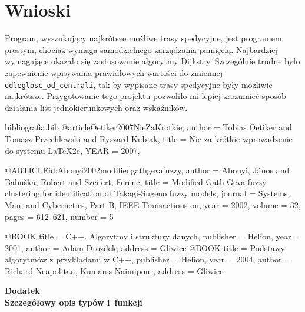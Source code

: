 \documentclass[12pt,a4paper,twoside]{article}
\begin{document}
\section{Wnioski}

Program, wyszukujący najkrótsze możliwe trasy spedycyjne, jest programem prostym, chociaż wymaga samodzielnego zarządzania pamięcią. Najbardziej wymagające okazało się zastosowanie algorytmy Dijkstry. Szczególnie trudne było zapewnienie wpisywania prawidłowych wartości do zmiennej \lstinline!odleglosc_od_centrali!, tak by wypisane trasy spedycyjne były możliwie najkrótsze. Przygotowanie tego projektu pozwoliło mi lepiej zrozumieć sposób działania list jednokierunkowych oraz wskaźników.



 

\begin{filecontents}{bibliografia.bib}
@article{Oetiker2007NieZaKrotkie,
	author       = {Tobias Oetiker and Tomasz Przechlewski and Ryszard Kubiak},
	title       = {Nie za kr\'{o}tkie wprowadzenie do systemu {L}a{T}e{X}2e}},
	YEAR         = {2007},


@ARTICLE{id:Abonyi2002modifiedgathgevafuzzy,
  author = {Abonyi, J\'{a}nos and Babu\v{s}ka, Robert and Szeifert, Ferenc},
  title = {{Modified Gath-Geva fuzzy clustering for identification of Takagi-Sugeno
	fuzzy models}},
  journal = {Systems, Man, and Cybernetics, Part B, IEEE Transactions on},
  year = {2002},
  volume = {32},
  pages = {612--621},
  number = {5}
}

@BOOK{
  title = {C++. Algorytmy i struktury danych},
  publisher = {Helion},
  year = {2001},
  author = {Adam Drozdek},
  address = {Gliwice}
}
@BOOK{
	title = {Podstawy algorytm\'{o}w z przykładami w C++},
	publisher = {Helion},
	year = {2004},
	author = {Richard Neapolitan, Kumarss Naimipour},
	address = {Gliwice}
}
\end{filecontents}






 
\cleardoublepage

\rule{0cm}{0cm}

\vfill

\begin{center}
\Huge\bfseries Dodatek\\Szczegółowy opis typów i~funkcji\par
\end{center}

\vfill 

\rule{0cm}{0cm}
\end{document}
